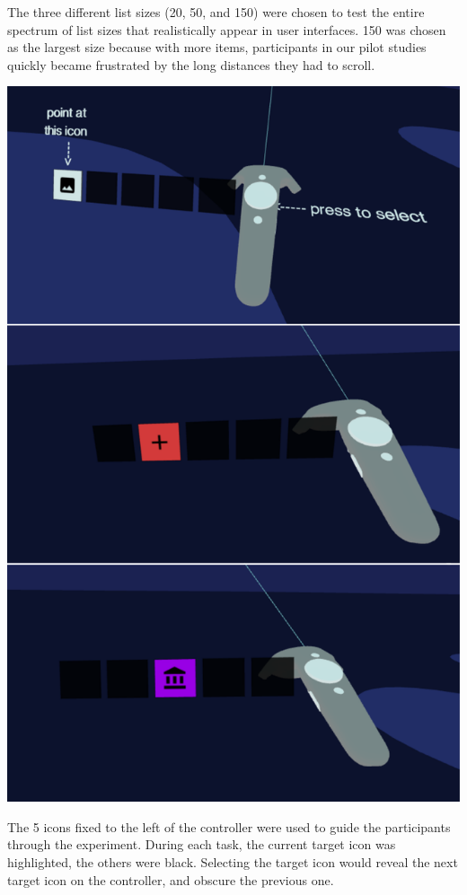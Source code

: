 \documentclass{tufte-book} %
\begin{document}
The three different list sizes (20, 50, and 150) were chosen to test the entire spectrum of list sizes that realistically appear in user interfaces. 150 was chosen as the largest size because with more items, participants in our pilot studies quickly became frustrated by the long distances they had to scroll.

\begin{marginfigure}
  \includegraphics[width=\linewidth]{controllers.png}
  \caption{The 5 icons fixed to the left of the controller were used to guide the participants through the experiment. During each task, the current target icon was highlighted, the others were black. Selecting the target icon would reveal the next target icon on the controller, and obscure the previous one.}
  \label{fig:controllers}
\end{marginfigure}
\end{document}
